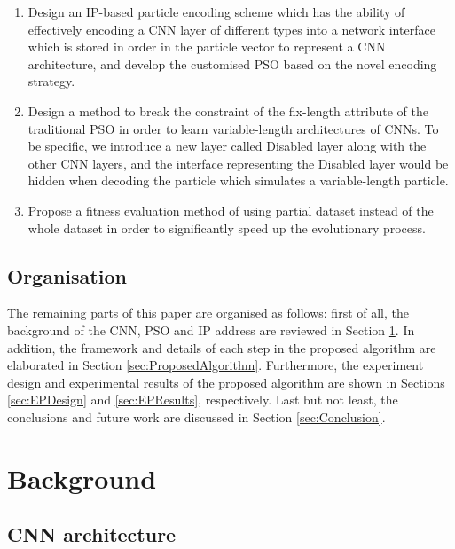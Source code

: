\documentclass[conference]{IEEEtran}
\begin{document}
\begin{enumerate}
	\item Design an IP-based particle encoding scheme which has the ability of effectively encoding a CNN layer of different types into a network interface which is stored in order in the particle vector to represent a CNN architecture, and develop the customised PSO based on the novel encoding strategy. 
	\item Design a method to break the constraint of the fix-length attribute of the traditional PSO in order to learn variable-length architectures of CNNs. To be specific, we introduce a new layer called Disabled layer along with the other CNN layers, and the interface representing the Disabled layer would be hidden when decoding the particle which simulates a variable-length particle. 
	\item Propose a fitness evaluation method of using partial dataset instead of the whole dataset in order to significantly speed up the evolutionary process. 
\end{enumerate} 

\subsection{Organisation}
The remaining parts of this paper are organised as follows: first of all, the background of the CNN, PSO and IP address are
reviewed in Section \ref{sec:Background}. In addition, the framework and details of each step in the proposed algorithm are elaborated in Section \ref{sec:ProposedAlgorithm}. Furthermore, the experiment design and experimental results of the proposed algorithm are shown in Sections \ref{sec:EPDesign} and \ref{sec:EPResults}, respectively. Last but not least, the conclusions and future work are discussed in Section \ref{sec:Conclusion}. 


\section{Background}\label{sec:Background}

\subsection{CNN architecture}\label{sec:CNNArchitecture}
\end{document}
